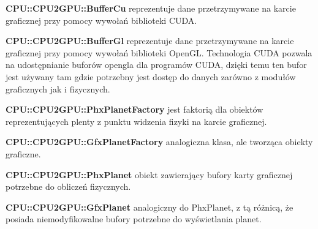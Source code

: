 \begin{description}
\item{\bf CPU::CPU2GPU::BufferCu} reprezentuje dane przetrzymywane na karcie graficznej przy pomocy wywołań biblioteki CUDA.
\item{\bf CPU::CPU2GPU::BufferGl} reprezentuje dane przetrzymywane na karcie graficznej przy pomocy wywołań biblioteki OpenGL. Technologia CUDA pozwala na udostępnianie buforów opengla dla programów CUDA, dzięki temu ten bufor jest używany tam gdzie potrzebny jest dostęp do danych zarówno z modułów graficznych jak i fizycznych.
\item{\bf CPU::CPU2GPU::PhxPlanetFactory} jest faktorią dla obiektów reprezentujących plenty z punktu widzenia fizyki na karcie graficznej.
\item{\bf CPU::CPU2GPU::GfxPlanetFactory} analogiczna klasa, ale tworząca obiekty graficzne.
\item{\bf CPU::CPU2GPU::PhxPlanet} obiekt zawierający bufory karty graficznej potrzebne do obliczeń fizycznych.
\item{\bf CPU::CPU2GPU::GfxPlanet} analogiczny do PhxPlanet, z tą różnicą, że posiada niemodyfikowalne bufory potrzebne do wyświetlania planet.
\end{description}

